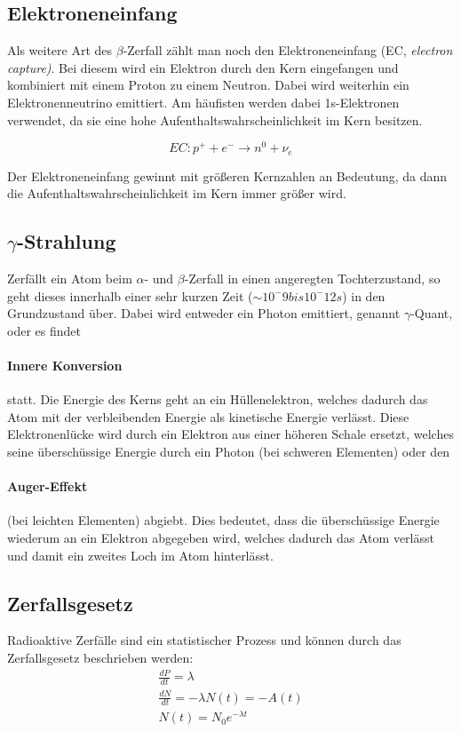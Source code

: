 \subsection{Elektroneneinfang}

Als weitere Art des $\beta$-Zerfall zählt man noch den Elektroneneinfang (EC, \emph{electron capture)}. Bei diesem wird ein Elektron durch den Kern eingefangen und kombiniert mit einem Proton zu einem Neutron. Dabei wird weiterhin ein Elektronenneutrino emittiert. Am häufisten werden dabei 1s-Elektronen verwendet, da sie eine hohe Aufenthaltswahrscheinlichkeit im Kern besitzen.

$$ EC: p^+ + e^- \rightarrow n^0 + \nu_e $$

Der Elektroneneinfang gewinnt mit größeren Kernzahlen an Bedeutung, da dann die Aufenthaltswahrscheinlichkeit im Kern immer größer wird.


\subsection{$\gamma$-Strahlung}

Zerfällt ein Atom beim $\alpha$- und $\beta$-Zerfall in einen angeregten Tochterzustand, so geht dieses innerhalb einer sehr kurzen Zeit ($\sim 10^-9 bis 10^-12 s$) in den Grundzustand über. Dabei wird entweder ein Photon emittiert, genannt $\gamma$-Quant, oder es findet \paragraph{Innere Konversion} statt. Die Energie des Kerns geht an ein Hüllenelektron, welches dadurch das Atom mit der verbleibenden Energie als kinetische Energie verlässt. Diese Elektronenlücke wird durch ein Elektron aus einer höheren Schale ersetzt, welches seine überschüssige Energie durch ein Photon (bei schweren Elementen) oder den \paragraph{Auger-Effekt} (bei leichten Elementen) abgiebt.
Dies bedeutet, dass die überschüssige Energie wiederum an ein Elektron abgegeben wird, welches dadurch das Atom verlässt und damit ein zweites Loch im Atom hinterlässt.

\subsection{Zerfallsgesetz}

Radioaktive Zerfälle sind ein statistischer Prozess und können durch das Zerfallsgesetz beschrieben werden:
\begin{gather}
 \frac{dP}{dt} = \lambda \\
 \frac{dN}{dt} = - \lambda N(t) = - A(t) \label{dNdtlambdaN}\\
 N(t) = N_0 e^{-\lambda t}
\end{gather}

